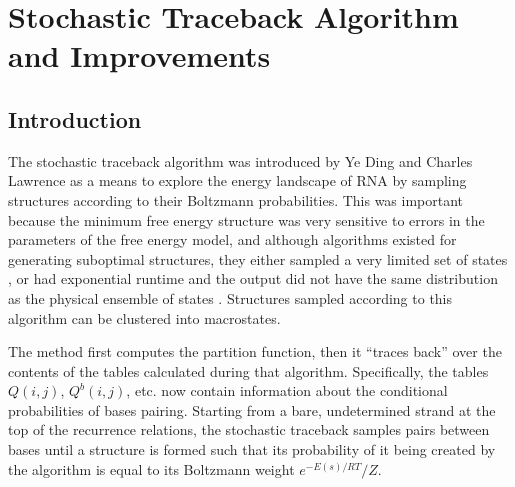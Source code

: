 \chapter{Stochastic Traceback Algorithm and Improvements}

\section{Introduction}

The stochastic traceback algorithm was introduced by Ye Ding and
Charles Lawrence \cite{ding2003statistical} as a means to explore the
energy landscape of RNA by sampling structures according to their
Boltzmann probabilities. This was important because the minimum free
energy structure was very sensitive to errors in the parameters of the
free energy model, and although algorithms existed for generating
suboptimal structures, they either sampled a very limited set of
states \cite{zuker1989finding}, or had exponential runtime and the
output did not have the same distribution as the physical ensemble of
states \cite{wuchty1999complete}. Structures sampled according to this
algorithm can be clustered into macrostates.

The method first computes the partition function, then it ``traces
back'' over the contents of the tables calculated during that
algorithm. Specifically, the tables $Q(i,j)$, $Q^b(i,j)$, etc. now
contain information about the conditional probabilities of bases
pairing. Starting from a bare, undetermined strand at the top of the
recurrence relations, the stochastic traceback samples pairs between
bases until a structure is formed such that its probability of it
being created by the algorithm is equal to its Boltzmann weight
$e^{-E(s)/RT}/Z$.

